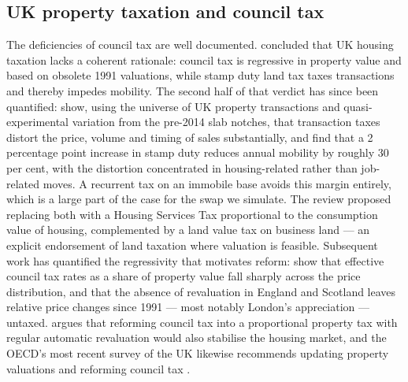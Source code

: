 \subsection{UK property taxation and council tax}

The deficiencies of council tax are well documented. \citet{mirrlees2011} concluded that UK housing taxation lacks a coherent rationale: council tax is regressive in property value and based on obsolete 1991 valuations, while stamp duty land tax taxes transactions and thereby impedes mobility. The second half of that verdict has since been quantified: \citet{best2018} show, using the universe of UK property transactions and quasi-experimental variation from the pre-2014 slab notches, that transaction taxes distort the price, volume and timing of sales substantially, and \citet{hilber2017} find that a 2 percentage point increase in stamp duty reduces annual mobility by roughly 30 per cent, with the distortion concentrated in housing-related rather than job-related moves. A recurrent tax on an immobile base avoids this margin entirely, which is a large part of the case for the swap we simulate. The review proposed replacing both with a Housing Services Tax proportional to the consumption value of housing, complemented by a land value tax on business land --- an explicit endorsement of land taxation where valuation is feasible. Subsequent work has quantified the regressivity that motivates reform: \citet{adam2020} show that effective council tax rates as a share of property value fall sharply across the price distribution, and that the absence of revaluation in England and Scotland leaves relative price changes since 1991 --- most notably London's appreciation --- untaxed. \citet{muellbauer2005} argues that reforming council tax into a proportional property tax with regular automatic revaluation would also stabilise the housing market, and the OECD's most recent survey of the UK likewise recommends updating property valuations and reforming council tax \citep{oecd2024}.

